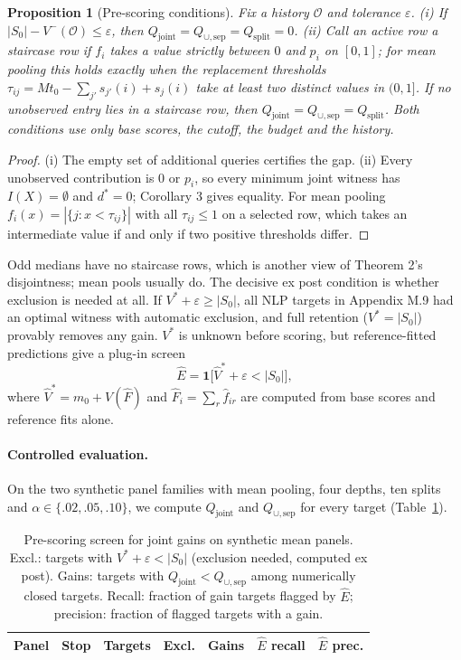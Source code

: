 \documentclass[11pt]{article}
\newtheorem{proposition}{Proposition}
\newcommand{\Qj}{Q_{\mathrm{joint}}}
\newcommand{\Qu}{Q_{\cup,\mathrm{sep}}}
\newcommand{\Qs}{Q_{\mathrm{split}}}
\newcommand{\Sz}{S_0}
\newcommand{\ind}{\mathbf{1}}
\begin{document}
\begin{proposition}[Pre-scoring conditions]
\label{prop:prescore}
Fix a history $\mathcal O$ and tolerance $\varepsilon$. (i) If $|\Sz|-V^-(\mathcal O)\le\varepsilon$, then $\Qj=\Qu=\Qs=0$. (ii) Call an active row a \emph{staircase row} if $f_i$ takes a value strictly between $0$ and $p_i$ on $[0,1]$; for mean pooling this holds exactly when the replacement thresholds $\tau_{ij}=Mt_0-\sum_{j'}s_{j'}(i)+s_j(i)$ take at least two distinct values in $(0,1]$. If no unobserved entry lies in a staircase row, then $\Qj=\Qu=\Qs$. Both conditions use only base scores, the cutoff, the budget and the history.
\end{proposition}
\begin{proof}
(i) The empty set of additional queries certifies the gap. (ii) Every unobserved contribution is $0$ or $p_i$, so every minimum joint witness has $I(X)=\emptyset$ and $d^*=0$; Corollary 3 gives equality. For mean pooling $f_i(x)=|\{j:x<\tau_{ij}\}|$ with all $\tau_{ij}\le1$ on a selected row, which takes an intermediate value if and only if two positive thresholds differ.
\end{proof}
Odd medians have no staircase rows, which is another view of Theorem 2's disjointness; mean pools usually do. The decisive ex post condition is whether exclusion is needed at all. If $V^*+\varepsilon\ge|\Sz|$, all NLP targets in Appendix M.9 had an optimal witness with automatic exclusion, and full retention ($V^*=|\Sz|$) provably removes any gain. $V^*$ is unknown before scoring, but reference-fitted predictions give a plug-in screen
\[
\hat E=\ind\big[\hat V^*+\varepsilon<|\Sz|\big],
\]
where $\hat V^*=m_0+V(\hat F)$ and $\hat F_i=\sum_r\hat f_{ir}$ are
computed from base scores and reference fits alone.

\paragraph{Controlled evaluation.} On the two synthetic panel families with mean pooling, four depths, ten splits and $\alpha\in\{.02,.05,.10\}$, we compute $\Qj$ and $\Qu$ for every target (Table~\ref{tab:predict}). %

\begin{table}[t]
\centering\small
\setlength{\tabcolsep}{3pt}
\begin{tabular}{@{}llrrrrr@{}}
\toprule
Panel & Stop & Targets & Excl. & Gains & $\hat E$ recall & $\hat E$ prec.\\
\midrule
\bottomrule
\end{tabular}
\caption{Pre-scoring screen for joint gains on synthetic mean panels. Excl.: targets with $V^*+\varepsilon<|\Sz|$ (exclusion needed, computed ex post). Gains: targets with $\Qj<\Qu$ among numerically closed targets. Recall: fraction of gain targets flagged by $\hat E$; precision: fraction of flagged targets with a gain.}
\label{tab:predict}
\end{table}
\end{document}

